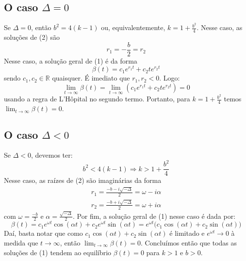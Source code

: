 \documentclass{article}
\begin{document}
\subsection{O caso $\Delta = 0$}
\hspace{12pt} Se $\Delta = 0$, então $b^2 = 4(k-1)$ ou, equivalentemente, $\displaystyle{k = 1 + \frac{b^2}{4}}$. Nesse caso, as soluções de (2) são 
\begin{equation*}
r_1 = -\frac{b}{2} = r_2
\end{equation*}
Nesse caso, a solução geral de (1) é da forma
\begin{equation*}
\beta (t) = c_1e^{r_1t} + c_2te^{r_2t}
\end{equation*}
sendo $c_1, c_2 \in\mathbb{R}$ quaisquer. É imediato que $r_1, r_2 < 0$. Logo:
\begin{equation*}
\lim_{t\to \infty}\beta (t) = \lim_{t\to \infty}(c_1e^{r_1t} + c_2te^{r_2t}) = 0
\end{equation*}
usando a regra de L'Hôpital no segundo termo.
Portanto, para $\displaystyle{k = 1 + \frac{b^2}{4}}$ temos $\displaystyle{\lim_{t\to \infty}\beta (t) = 0}$. 

\subsection{O caso $\Delta < 0$}
\hspace{12pt} Se $\Delta < 0$, devemos ter:
\begin{equation*}
b^2 < 4(k - 1) \Rightarrow k > 1 + \frac{b^2}{4}
\end{equation*}
Nesse caso, as raízes de (2) são imaginárias da forma
\begin{align*}
r_1 = \frac{-b -i\sqrt{-\Delta}}{2} = \omega - i\alpha \\
r_2 = \frac{-b +i\sqrt{-\Delta}}{2} = \omega + i\alpha 
\end{align*}
com $\displaystyle{\omega = \frac{-b}{2}}$ e $\displaystyle{\alpha = \frac{\sqrt{-\Delta}}{2}}$. Por fim, a solução geral de (1) nesse caso é dada por:
\begin{equation*}
\beta (t) = c_1e^{\omega t}\cos(\alpha t) + c_2e^{\omega t}\sin(\alpha t) = e^{\omega t}\Big( c_1\cos(\alpha t) + c_2\sin(\alpha t)  \Big)
\end{equation*}
Daí, basta notar que como $\displaystyle{c_1\cos(\alpha t) + c_2\sin(\alpha t)}$ é limitado e $e^{\omega t}\to 0$  à medida que $t\to\infty$, então $\displaystyle{\lim_{t\to \infty}\beta(t) = 0}$. Concluímos então que todas as soluções de (1) tendem ao equilíbrio $\beta (t) = 0$ para $k > 1$ e $b > 0$.
\end{document}
